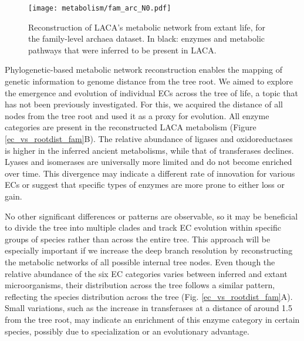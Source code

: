 \begin{figure}[H]
    \centering
    \texttt{[image: metabolism/fam\_arc\_N0.pdf]}
    \caption{Reconstruction of LACA's metabolic network from extant life, for the family-level archaea dataset. In black: enzymes and metabolic pathways that were inferred to be present in LACA.}    
    \label{fam4arc_metnet}
\end{figure}


Phylogenetic-based metabolic network reconstruction enables the mapping of genetic information to genome distance from the tree root. We aimed to explore the emergence and evolution of individual ECs across the tree of life, a topic that has not been previously investigated. For this, we acquired the distance of all nodes from the tree root and used it as a proxy for evolution. All enzyme categories are present in the reconstructed LACA metabolism (Figure \ref{ec_vs_rootdist_fam}B). The relative abundance of ligases and oxidoreductases is higher in the inferred ancient metabolisms, while that of transferases declines. Lyases and isomerases are universally more limited and do not become enriched over time. This divergence may indicate a different rate of innovation for various ECs or suggest that specific types of enzymes are more prone to either loss or gain.

No other significant differences or patterns are observable, so it may be beneficial to divide the tree into multiple clades and track EC evolution within specific groups of species rather than across the entire tree. This approach will be especially important if we increase the deep branch resolution by reconstructing the metabolic networks of all possible internal tree nodes. Even though the relative abundance of the six EC categories varies between inferred and extant microorganisms, their distribution across the tree follows a similar pattern, reflecting the species distribution across the tree (Fig. \ref{ec_vs_rootdist_fam}A). Small variations, such as the increase in transferases at a distance of around 1.5 from the tree root, may indicate an enrichment of this enzyme category in certain species, possibly due to specialization or an evolutionary advantage.


